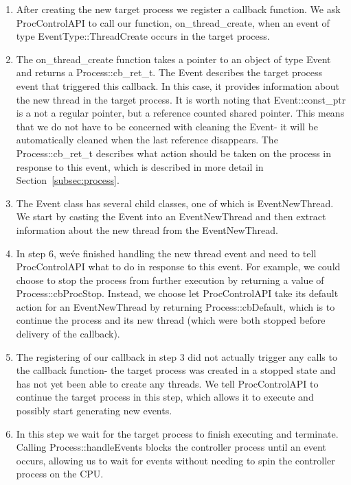 \begin{enumerate}
\item After creating the new target process we register a callback
function. We ask ProcControlAPI to call our
function, on\_thread\_create, when an event of type EventType::ThreadCreate
occurs in the target process.

\item The on\_thread\_create function takes a pointer to an object of type
Event and returns a Process::cb\_ret\_t. The Event describes the target
process event that triggered
this callback. In this case, it provides information about the new thread in
the target process. It is worth noting that Event::const\_ptr is a not a
regular pointer, but a reference counted shared pointer. This means that we
do not have to be concerned with cleaning the Event- it
will be automatically cleaned when the last reference disappears. The
Process::cb\_ret\_t describes what action should be taken on the process in
response to this event, which is described in more detail in
Section~\ref{subsec:process}.

\item The Event class has several child classes, one of which is EventNewThread.
We start by casting the Event into an EventNewThread and then extract
information about the new thread from the EventNewThread.

\item In step 6, we\'ve finished handling the new thread
event and need to tell ProcControlAPI what to do in response to this event.
For example, we could choose to stop the process from further execution by
returning a value of Process::cbProcStop. Instead, we choose let
ProcControlAPI take its default action for an EventNewThread by returning
Process::cbDefault, which is to continue the process and its new thread (which
were both stopped before delivery of the callback).

\item The registering of our callback in step 3 did not actually trigger any
calls to the callback function- the target process was
created in a stopped state and has not yet been able to create any threads.
We tell ProcControlAPI to continue the target process in this step, which
allows it to execute and possibly start generating new events.

\item In this step we wait for the target process to finish executing and
terminate. Calling Process::handleEvents
blocks the controller process until an event occurs, allowing us to wait for
events without needing to spin the controller process on the CPU.
\end{enumerate}
